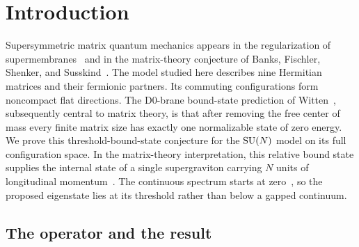 \section{Introduction}
\label{sec:introduction}

Supersymmetric matrix quantum mechanics appears in the regularization of
supermembranes~\cite[Section~3]{DeWitHoppeNicolai1988} and in the
matrix-theory conjecture of Banks, Fischler, Shenker, and
Susskind~\cite{BFSS1997}. The model studied here describes nine Hermitian
matrices and their fermionic partners. Its commuting configurations form
noncompact flat directions.
The D0-brane bound-state prediction of Witten~\cite[Section~4.2]{Witten1996BoundStates},
subsequently central to matrix theory, is that after removing the free
center of mass every finite matrix size has exactly one normalizable
state of zero energy. We prove this threshold-bound-state conjecture for the
\(\operatorname{SU}(N)\) model on its full configuration space.
In the matrix-theory interpretation, this relative bound state supplies
the internal state of a single supergraviton carrying \(N\) units of
longitudinal momentum~\cite[Section~5]{BFSS1997}.
The continuous spectrum starts at zero~\cite{DeWitLuscherNicolai1989},
so the proposed eigenstate lies at its threshold rather than below a
gapped continuum.

\subsection{The operator and the result}
\label{sec:model}


